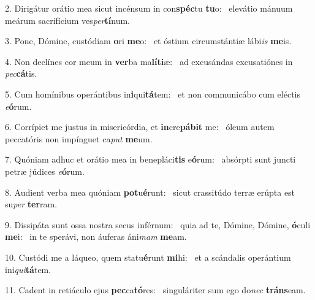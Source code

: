2. Dirigátur orátio mea sicut incénsum in con\textbf{spéc}tu \textbf{tu}o: \ast\  elevátio mánuum meárum sacrifícium ves\textit{per}\textbf{tí}num.\

3. Pone, Dómine, custódiam \textbf{o}ri \textbf{me}o: \ast\  et óstium circumstántiæ lábi\textit{is} \textbf{me}is.\

4. Non declínes cor meum in \textbf{ver}ba ma\textbf{lí}\textbf{ti}æ: \ast\  ad excusándas excusatiónes in \textit{pec}\textbf{cá}tis.\

5. Cum homínibus operántibus in\textbf{i}qui\textbf{tá}tem: \ast\  et non communicábo cum eléctis \textit{e}\textbf{ó}rum.\

6. Corrípiet me justus in misericórdia, et \textbf{in}cre\textbf{pá}\textbf{bit} me: \ast\  óleum autem peccatóris non impínguet ca\textit{put} \textbf{me}um.\

7. Quóniam adhuc et orátio mea in benepláci\textbf{tis} e\textbf{ó}rum: \ast\  absórpti sunt juncti petræ júdices \textit{e}\textbf{ó}rum.\

8. Audient verba mea quóniam \textbf{pot}u\textbf{é}runt: \ast\  sicut crassitúdo terræ erúpta est su\textit{per} \textbf{ter}ram.\

9. Dissipáta sunt ossa nostra secus inférnum: \dag\  quia ad te, Dómine, Dómine, \textbf{ó}culi \textbf{me}i: \ast\  in te sperávi, non áuferas áni\textit{mam} \textbf{me}am.\

10. Custódi me a láqueo, quem statu\textbf{é}runt \textbf{mi}hi: \ast\  et a scándalis operántium ini\textit{qui}\textbf{tá}tem.\

11. Cadent in retiáculo ejus \textbf{pec}ca\textbf{tó}res: \ast\  singuláriter sum ego do\textit{nec} \textbf{tráns}eam.\


